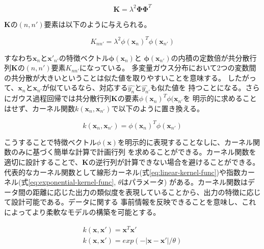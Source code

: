 \begin{equation}
\boldsymbol{K} = \lambda^2\boldsymbol{\Phi}\boldsymbol{\Phi}^T
\end{equation}

$\boldsymbol{K}$の$(n,n')$要素は以下のように与えられる。

\begin{equation}
K_{nn'} = \lambda^2\phi(\boldsymbol{x}_{n})^T\phi(\boldsymbol{x}_{n'})
\end{equation}

すなわち$\boldsymbol{x}_{n}$と$\boldsymbol{x'}_{n'}$の特徴ベクトル$\boldsymbol{\phi}(\boldsymbol{x}_{n})$と
$\boldsymbol{\phi}(\boldsymbol{x}_{n'})$の内積の定数倍が共分散行列$\boldsymbol{K}$の$(n,n')$要素$K_{nn'}$になっている。
多変量ガウス分布において2つの変数間の共分散が大きいということは似た値を取りやすいことを意味する。
したがって、$\boldsymbol{x}_{n}$と$\boldsymbol{x}_{n'}$が似ているなら、対応する$\hat{y_{n}}$と$\hat{y_{n'}}$も似た値を
持つことになる。さらにガウス過程回帰では共分散行列$\boldsymbol{K}$の要素$\phi(\boldsymbol{x}_{n})^T\phi(\boldsymbol{x}_{n'}$を
明示的に求めることはせず、カーネル関数$k(\boldsymbol{x}_{n}, \boldsymbol{x}_{n'})$で以下のように置き換える。

\begin{equation}
k(\boldsymbol{x}_{n}, \boldsymbol{x}_{n'}) = \phi(\boldsymbol{x}_{n})^T\phi(\boldsymbol{x}_{n'}) 
\end{equation}

こうすることで特徴ベクトル$\phi(\boldsymbol{x})$を明示的に表現することなしに、カーネル関数のみに基づく簡単な計算で計画行列
を求めることができる。カーネル関数を適切に設計することで、$\boldsymbol{K}$の逆行列が計算できない場合を避けることができる。
代表的なカーネル関数として線形カーネル(式\ref{eq:linear-kernel-func})や指数カーネル(式\ref{eq:exponential-kernel-func}, $\theta$はパラメータ)
がある。カーネル関数はデータ間の距離に応じた出力の類似度を表現していることから、出力の特徴に応じて設計可能である。データに関する
事前情報を反映できることを意味し、これによってより柔軟なモデルの構築を可能とする。

\begin{gather}
k(\boldsymbol{x}, \boldsymbol{x'}) = \boldsymbol{x}^T\boldsymbol{x'} \label{eq:linear-kernel-func} \\
k(\boldsymbol{x}, \boldsymbol{x'}) = exp(-|\boldsymbol{x} - \boldsymbol{x'}|/\theta) \label{eq:exponential-kernel-func}
\end{gather}

